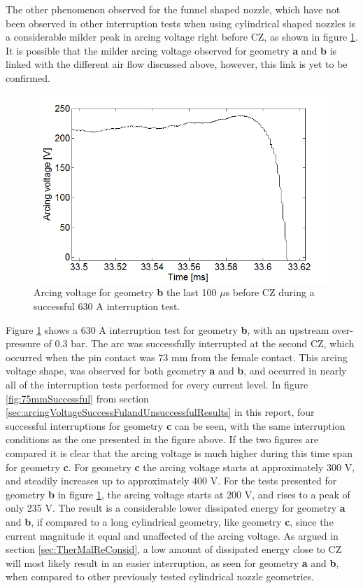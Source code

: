 \documentclass[10pt,b5paper,twoside]{article}
\begin{document}
The other phenomenon observed for the funnel shaped nozzle, which have not been observed in other interruption tests when using cylindrical shaped nozzles is a considerable milder peak in arcing voltage right before CZ, as shown in figure \ref{fig:mildFunnelArcVlotage}. It is possible that the milder arcing voltage observed for geometry \textbf{a} and \textbf{b} is linked with the different air flow discussed above, however, this link is yet to be confirmed.

\begin{figure}[H]
\centering
\includegraphics[scale=0.5]{Bilder/Results/funnelArcDrop.PNG}
\caption{Arcing voltage for geometry \textbf{b} the last 100 $\mu$s before CZ during a successful 630 A interruption test.} \label{fig:mildFunnelArcVlotage}
\end{figure}

Figure \ref{fig:mildFunnelArcVlotage} shows a 630 A interruption test for geometry \textbf{b}, with an upstream over-pressure of 0.3 bar. The arc was successfully interrupted at the second CZ, which occurred when the pin contact was 73 mm from the female contact. This arcing voltage shape, was observed for both geometry \textbf{a} and \textbf{b}, and occurred in nearly all of the interruption tests performed for every current level. In figure \ref{fig:75mmSuccessful} from section \ref{sec:arcingVoltageSuccessFulandUnsuccessfulResults} in this report, four successful interruptions for geometry \textbf{c} can be seen, with the same interruption conditions as the one presented in the figure above. If the two figures are compared it is clear that the arcing voltage is much higher during this time span for geometry \textbf{c}. For geometry \textbf{c} the arcing voltage starts at approximately 300 V, and steadily increases up to approximately 400 V. For the tests presented for geometry \textbf{b} in figure \ref{fig:mildFunnelArcVlotage}, the arcing voltage starts at 200 V, and rises to a peak of only 235 V. The result is a considerable lower dissipated energy for geometry \textbf{a} and \textbf{b}, if compared to a long cylindrical geometry, like geometry \textbf{c}, since the current magnitude it equal and unaffected of the arcing voltage. As argued in section \ref{sec:TherMalReConsid}, a low amount of dissipated energy close to CZ will most likely result in an easier interruption, as seen for geometry \textbf{a} and \textbf{b}, when compared to other previously tested cylindrical nozzle geometries.
\end{document}
